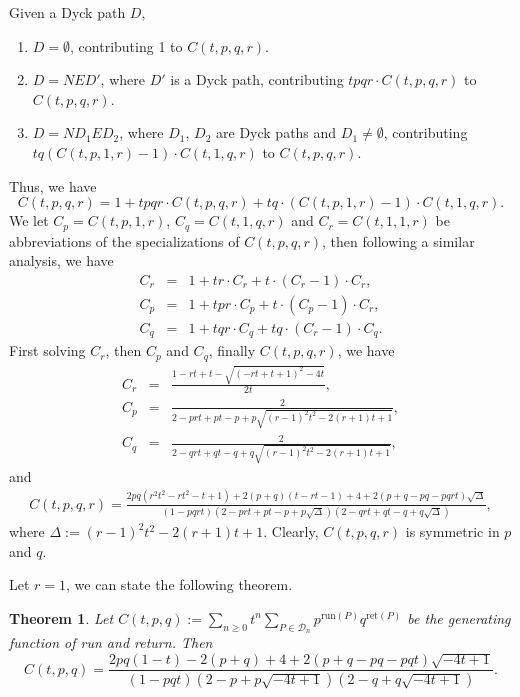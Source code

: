 \documentclass[11pt,a4paper,reqno]{article}
\newtheorem{thm}{Theorem}[section]
\newcommand{\DD}{\mathcal{D}}
\newcommand{\run}{\mathrm{run}}
\newcommand{\ret}{\mathrm{ret}}
\begin{document}
{	Given a Dyck path $D$,
	\begin{enumerate}[label=(\roman*)]
		\item $D=\emptyset$, contributing 1 to $C(t,p,q,r)$.
		\item $D=NED'$, where $D'$ is a Dyck path, contributing $tpqr\cdot C(t,p,q,r)$ to $C(t,p,q,r)$.
		\item $D=ND_1ED_2$, where $D_1$, $D_2$ are Dyck paths and $D_1\neq\emptyset$, contributing $tq(C(t,p,1,r)-1)\cdot C(t,1,q,r)$ to $C(t,p,q,r)$.
	\end{enumerate}
	Thus, we have
	$$
	C(t,p,q,r)=1+tpqr\cdot C(t,p,q,r)+tq\cdot (C(t,p,1,r)-1)\cdot C(t,1,q,r).
	$$
	We let $C_p=C(t,p,1,r)$, $C_q=C(t,1,q,r)$ and $C_r=C(t,1,1,r)$ be abbreviations of the specializations of $C(t,p,q,r)$, then following a similar analysis, we have
	\begin{eqnarray*}
		C_r&=&1+tr\cdot C_r+t\cdot (C_r-1)\cdot C_r,\\
		C_p&=&1+tpr\cdot C_p+t\cdot (C_p-1)\cdot C_r,\\
		C_q&=&1+tqr\cdot C_q+tq\cdot (C_r-1)\cdot C_q.
	\end{eqnarray*}
	First solving $C_r$, then $C_p$ and $C_q$, finally $C(t,p,q,r)$, we have 
	\begin{eqnarray*}
		C_r&=&\frac{1-r t+t-\sqrt{(-r t+t+1)^2-4 t}}{2 t},\\
		C_p&=&\frac{2}{2-prt+pt-p+ p \sqrt{(r-1)^2 t^2-2 (r+1) t+1}},\\
		C_q&=&\frac{2}{2-qrt+qt-q+ q \sqrt{(r-1)^2 t^2-2 (r+1) t+1}},
	\end{eqnarray*}
	and
	\begin{eqnarray*}
		C(t,p,q,r)=\frac{2 p q (r^2t^2-r t^2-t+1)+2(p+q)(t- r t-1)+4+2(p + q - p q - p q r t) \sqrt{\Delta} }{(1-p q r t)\left(2-prt+pt-p+p \sqrt{\Delta}\right) \left(2-qrt+qt-q+q \sqrt{\Delta}\right) },
	\end{eqnarray*}
	where $\Delta:=(r-1)^2 t^2-2(r+1) t+1$. Clearly, $C(t,p,q,r)$ is symmetric in $p$ and $q$. {Let $r=1$, we can state the following theorem.
    \begin{thm}
        Let $C(t,p,q):=\sum_{n\geq 0} t^n\sum_{P\in\DD_{n}} p^{\run(P)} q^{\ret(P)}$ be the generating function of run and return. Then
        $$
        C(t,p,q)=
		\frac{2 p q (1-t)-2(p+q)+4+2(p + q - p q - p q t) \sqrt{ -4t+1} }{(1-p q  t)\left(2-p+p \sqrt{ -4t+1}\right) \left(2-q+q \sqrt{ -4 t+1}\right) }.
        $$
    \end{thm}
    }

}
\end{document}
